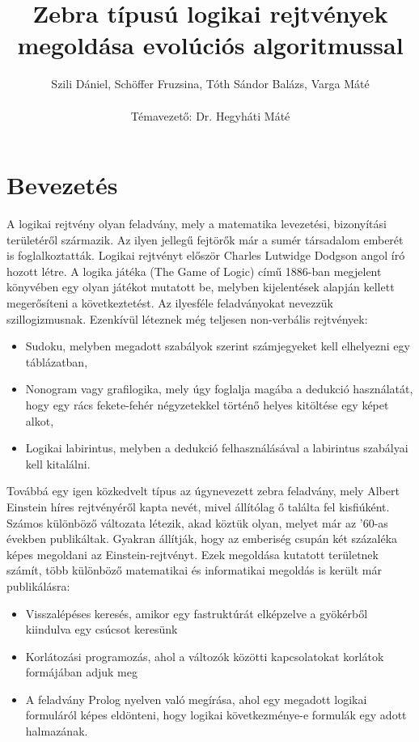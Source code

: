 \documentclass[12ppt,a4paper,oneside]{report}
\author{Szili Dániel, Schöffer Fruzsina, Tóth Sándor Balázs, Varga Máté\\\ \\Témavezető: Dr. Hegyháti Máté}
\title{Zebra típusú logikai rejtvények megoldása evolúciós algoritmussal}
\begin{document}
\maketitle

\tableofcontents

\chapter{Bevezetés} %
	{A logikai rejtvény olyan feladvány, mely a matematika levezetési, bizonyítási területéről származik. Az ilyen jellegű fejtörők már a sumér társadalom emberét is foglalkoztatták. Logikai rejtvényt először Charles Lutwidge Dodgson angol író hozott létre. A logika játéka (The Game of Logic) című 1886-ban megjelent könyvében egy olyan játékot mutatott be, melyben kijelentések alapján kellett megerősíteni a következtetést. Az ilyesféle feladványokat nevezzük szillogizmusnak. Ezenkívül léteznek még teljesen non-verbális rejtvények:}
	\begin{itemize}
	\item Sudoku, melyben megadott szabályok szerint számjegyeket kell elhelyezni egy táblázatban,
	\item Nonogram vagy grafilogika, mely úgy foglalja magába a dedukció használatát, hogy egy rács fekete-fehér négyzetekkel történő helyes kitöltése egy képet alkot,
	\item Logikai labirintus, melyben a dedukció felhasználásával a labirintus szabályai kell kitalálni.
	\end{itemize}

	{Továbbá egy igen közkedvelt típus az úgynevezett zebra feladvány, mely Albert Einstein híres rejtvényéről kapta nevét, mivel állítólag ő találta fel kisfiúként. Számos különböző változata létezik, akad köztük olyan, melyet már az ’60-as években publikáltak. Gyakran állítják, hogy az emberiség csupán két százaléka képes megoldani az Einstein-rejtvényt. Ezek megoldása kutatott területnek számít, több különböző matematikai és informatikai megoldás is került már publikálásra:}
	\begin{itemize}
	\item Visszalépéses keresés, amikor egy fastruktúrát elképzelve a gyökérből kiindulva egy csúcsot keresünk
	\item Korlátozási programozás, ahol a változók közötti kapcsolatokat korlátok formájában adjuk meg
	\item A feladvány Prolog nyelven való megírása, ahol egy megadott logikai formuláról képes eldönteni, hogy logikai következménye-e formulák egy adott halmazának.
	\end{itemize}
\end{document}
